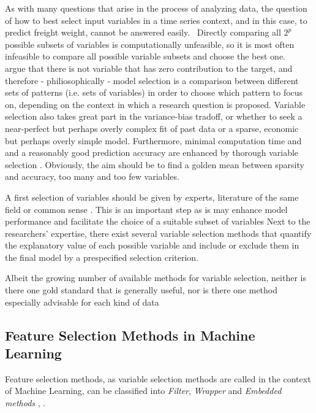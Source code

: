 \documentclass[a4paper, 11pt]{article}
\begin{document}
As with many questions that arise in the process of analyzing data, the question of how to best select input variables in a time series context, and in this case, to predict freight weight, cannot be answered easily. \ 
Directly comparing all $2^p$ possible subsets of variables is computationally unfeasible, so it is most often infeasible to compare all possible variable subsets and choose the best one. 
\\
\cite{Wit.2012} argue that there is not variable that has zero contribution to the target, and therefore - philiosophically - model selection is a comparison between different sets of patterns (i.e. sets of variables) in order to choose which pattern to focus on, depending on the context in which a research question is proposed. Variable selection also takes great part in the variance-bias tradoff, or whether to seek a near-perfect  but perhaps overly complex fit of past data or a sparse, economic but perhaps overly simple model. Furthermore, minimal computation time and and a reasonably good prediction accuracy are enhanced by thorough variable selection \citep{Saeys.2007}.  Obviously, the aim should be to find a golden mean between sparsity and accuracy, too many and too few variables. 

A first selection of variables should be given by experts, literature of the same field or common sense \citep{Heinze.2018}. This is an important step as is may enhance model performance and facilitate the choice of a suitable subset of variables \citep{BenIshak.2016}
Next to the researchers' expertise, there exist several variable selection methods that quantify the explanatory value of each possible variable and include or exclude them in the final model by a prespecified selection criterion.\


Albeit the growing number of available methods for variable selection, neither is there one gold standard that is generally useful, nor is there one method especially advisable for each kind of data \citep{Taghizadeh.2017}\\

\subsection{Feature Selection Methods in Machine Learning}
Feature selection methods, as variable selection methods are called in the context of Machine Learning, can be classified into \textit{Filter}, \textit{Wrapper} and \textit{Embedded methods} \citep{Chandrashekar.2014}, . \
\end{document}
